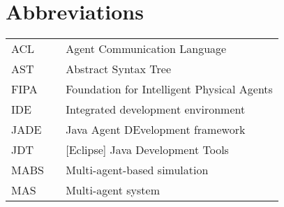 \chapter*{Abbreviations}

\begin{flushleft}
\begin{tabular}{l p{0.8\linewidth}}
ACL		 & Agent Communication Language\\
AST		 & Abstract Syntax Tree\\
FIPA	 & Foundation for Intelligent Physical Agents\\
IDE 	 & Integrated development environment\\
JADE	 & Java Agent DEvelopment framework\\
JDT		 & [Eclipse] Java Development Tools \\
MABS	 & Multi-agent-based simulation\\
MAS      & Multi-agent system\\

\end{tabular}
\end{flushleft}

